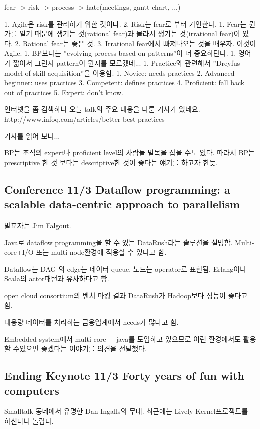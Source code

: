 \documentclass[a4paper]{article}
\begin{document}
fear -> risk -> process -> hate(meetings, gantt chart, ...)
 
1. Agile은 risk를 관리하기 위한 것이다.
2. Risk는 fear로 부터 기인한다.
1. Fear는 뭔가를 알기 때문에 생기는 것(rational fear)과 몰라서 생기는 것(irrational fear)이 있다.
2. Rational fear는 좋은 것.
3. Irrational fear에서 빠져나오는 것을 배우자. 이것이 Agile.
1. BP보다는 ”evolving process based on patterns”이 더 중요하단다.
1. 영어가 짧아서 그런지 pattern이 뭔지를 모르겠네...
1. Practice와 관련해서 ”Dreyfus model of skill acquisition”을 이용함.
1. Novice: needs practices
2. Advanced beginner: uses practices
3. Competent: defines practices
4. Proficient: fall back out of practices
5. Expert: don’t know.
 
인터넷을 좀 검색하니 오늘 talk의 주요 내용을 다룬 기사가 있네요.
http://www.infoq.com/articles/better-best-practices
 
기사를 읽어 보니...

BP는 조직의 expert나 proficient level의 사람들 발목을 잡을 수도 있다.
따라서 BP는 prescriptive 한 것 보다는 descriptive한 것이 좋다는 얘기를
하고자 한듯.
 
\subsection{Conference 11/3 Dataflow programming: a scalable data-centric approach to parallelism}
 
발표자는 Jim Falgout.
 
Java로 dataflow programming을 할 수 있는 DataRush라는 솔루션을 설명함.
Multi-core+I/O 또는 multi-node환경에 적용할 수 있다고 함.
 
Dataflow는 DAG 의 edge는 데이터 queue, 노드는 operator로 표현됨.
Erlang이나 Scala의 actor패턴과 유사하다고 함.
 
open cloud consortium의 벤치 마킹 결과 DataRush가 Hadoop보다 성능이 좋다고 함.
 
대용량 데이터를 처리하는 금융업계에서 needs가 많다고 함. 
 
Embedded system에서 multi-core + java를 도입하고 있으므로 이런
환경에서도 활용할 수있으면 좋겠다는 이야기를 의견을 전달했다.
 
\subsection{Ending Keynote 11/3 Forty years of fun with computers}
 
Smalltalk 동네에서 유명한 Dan Ingalls의 무대.
최근에는  Lively Kernel프로젝트를 하신다니 놀랍다.
 
\end{document}
